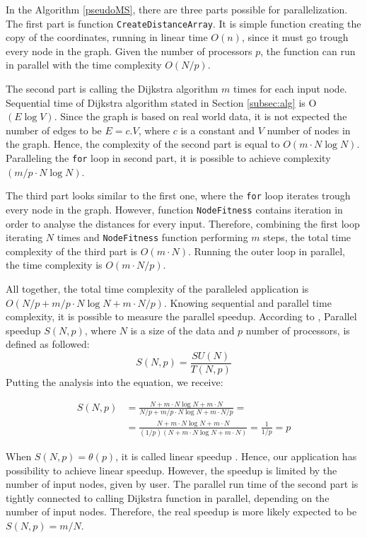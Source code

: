 \documentclass[thesis=M,english]{FITthesis}[2012/10/20]
\begin{document}
In the Algorithm \ref{pseudoMS}, there are three parts possible for parallelization. 
The first part is function \texttt{CreateDistanceArray}. It is simple function creating the copy of the coordinates, running in linear time $O(n)$, since it must go trough every node in the graph. Given the number of processors $p$, the function can run in parallel with the time complexity $O(N/p)$.

The second part is calling the Dijkstra algorithm $m$ times for each input node. Sequential time of Dijkstra algorithm stated in Section \ref{subsec:alg} is O$(E \log V)$. Since the graph is based on real world data, it is not expected the number of edges to be $E = c . V$, where $c$ is a constant and $V$ number of nodes in the graph. Hence, the complexity of the second part is equal to $O(m \cdot N \log N)$. Paralleling the \texttt{for} loop in second part, it is possible to achieve complexity $(m/p \cdot N \log N)$.

The third part looks similar to the first one, where the \texttt{for} loop iterates trough every node in the graph. However, function \texttt{NodeFitness} contains iteration in order to analyse the distances for every input. Therefore, combining the first loop iterating $N$ times and \texttt{NodeFitness} function performing $m$ steps, the total time complexity of the third part is $O(m \cdot N)$. Running the outer loop in parallel, the time complexity is $O(m \cdot N/p)$.

All together, the total time complexity of the paralleled application is $O(N/p + m/p \cdot N \log N + m \cdot N/p)$. Knowing sequential and parallel time complexity, it is possible to measure the parallel speedup. According to \cite{Tvrdik10}, Parallel speedup $S(N, p)$, where $N$ is a size of the data and $p$ number of processors, is defined as followed: 
\begin{equation}
S(N, p) = \frac{SU(N)}{T(N,p)}
\end{equation}
Putting the analysis into the equation, we receive:

\begin{align*}
S(N, p) &= \frac{N + m \cdot N \log N + m \cdot N}{N/p + m/p \cdot N \log N + m \cdot N/p} =  \\
&= \frac{N + m \cdot N \log N + m \cdot N}{(1/p)(N + m \cdot N \log N + m \cdot N)} = \frac{1}{1/p} = p
\end{align*}

When $S(N, p) = \theta(p)$, it is called linear speedup \cite{Tvrdik10}. Hence, our application has possibility to achieve linear speedup. However, the speedup is limited by the number of input nodes, given by user. The parallel run time of the second part is tightly connected to calling Dijkstra function in parallel, depending on the number of input nodes. Therefore, the real speedup is more likely expected to be $S(N, p) = m/N$.
\end{document}
